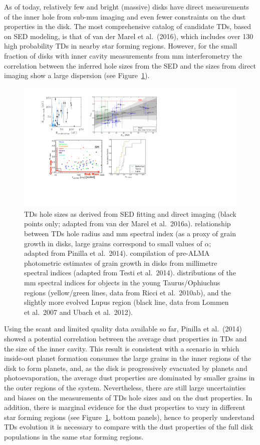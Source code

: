\documentclass[10pt,fleqn,twoside]{article}
\begin{document}
As of today, relatively few and bright (massive) disks have direct measurements of the inner hole from sub-mm imaging
and even fewer constraints on the dust properties in the disk. The most comprehensive catalog of candidate TDs, based on SED modeling, is that of van der Marel et al.~(2016), which includes over 130 high probability TDs in nearby star forming regions. However, for the small fraction of disks with inner cavity measurements from mm interferometry the correlation between the inferred hole sizes from the SED and the sizes from direct imaging show a large dispersion (see Figure~\ref{f_TDsiz}). 
\begin{figure}
\centerline{\includegraphics[scale=0.7]{f_dust_radii_tds.pdf}}
\caption{ TDs hole sizes as derived from SED fitting
  and direct imaging (black points only; adapted from van der Marel et
  al.~2016a).  relationship between TDs hole radius
  and mm spectral index (as a proxy of grain growth in disks, large grains
  correspond to small values of $\alpha$; adapted from Pinilla et
  al.~2014).  compilation of pre-ALMA photometric
  estimates of grain growth in disks from millimetre spectral indices
  (adapted from Testi et al.~2014). 
  distributions of the mm spectral indices for objects in the young
  Taurus/Ophiuchus regions (yellow/green lines, data from Ricci et
  al.~2010ab), and the slightly more evolved Lupus region (black line, data
  from Lommen et al.~2007 and Ubach et al.~2012).}
\label{f_TDsiz}
\end{figure}
Using the scant and limited quality data available so far, Pinilla et al.~(2014) showed a potential correlation between the average dust properties in TDs and the size of the inner cavity. This result is consistent with a scenario in which inside-out planet formation consumes the large grains in the inner regions of the disk to form planets, and, as the disk is progressively evacuated by planets and photoevaporation, the average dust properties are dominated by smaller grains in the outer regions of the
system. Nevertheless, there are still large uncertainties and biases on the measurements of TDs hole sizes and on the dust properties. In addition, there is marginal evidence for the dust properties to vary in different star forming regions (see Figure~\ref{f_TDsiz}, bottom panels), hence to properly understand TDs  evolution it is necessary to compare with the dust properties of the full disk populations in the same star forming regions.
\end{document}
